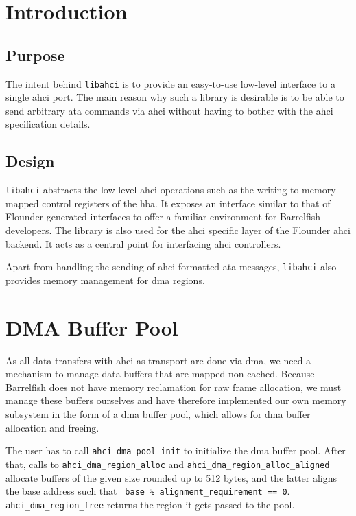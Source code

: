 \section{Introduction}

\newcommand{\libahci}{\lstinline+libahci+\xspace}

\subsection{Purpose}

The intent behind \libahci is to provide an easy-to-use low-level interface to
a single \ac{ahci} port. The main reason why such a library is desirable is to
be able to send arbitrary \ac{ata} commands via \ac{ahci} without having to
bother with the \ac{ahci} specification details.

\subsection{Design}

\libahci abstracts the low-level \ac{ahci} operations such as the writing to
memory mapped control registers of the \ac{hba}. It exposes an interface
similar to that of Flounder-generated interfaces to offer a familiar
environment for Barrelfish developers.  The library is also used for the
\ac{ahci} specific layer of the Flounder \ac{ahci} backend. It acts as a
central point for interfacing \ac{ahci} controllers.

Apart from handling the sending of \ac{ahci} formatted \ac{ata} messages,
\libahci also provides memory management for \acs{dma} regions.

\section{DMA Buffer Pool}

As all data transfers with \ac{ahci} as transport are done via \acs{dma}, we
need a mechanism to manage data buffers that are mapped non-cached. Because
Barrelfish does not have memory reclamation for raw frame allocation, we must
manage these buffers ourselves and have therefore implemented our own memory
subsystem in the form of a \acs{dma} buffer pool, which allows for \acs{dma}
buffer allocation and freeing.

The user has to call \lstinline+ahci_dma_pool_init+ to initialize the \acs{dma}
buffer pool. After that, calls to \lstinline+ahci_dma_region_alloc+ and
\lstinline+ahci_dma_region_alloc_aligned+ allocate buffers of the given size
rounded up to 512 bytes, and the latter aligns the base address such that {\tt
base \% alignment\_requirement == 0}. \lstinline+ahci_dma_region_free+ returns
the region it gets passed to the pool.

